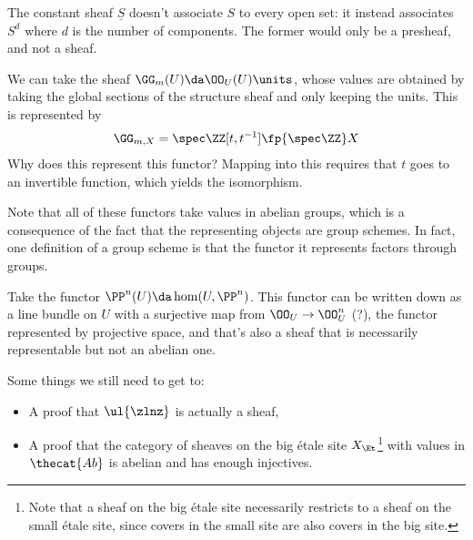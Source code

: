 \begin{warnings}

The constant sheaf \(\underline{S}\) doesn't associate \(S\) to every
open set: it instead associates \(S^d\) where \(d\) is the number of
components. The former would only be a presheaf, and not a sheaf.

\end{warnings}

\begin{example}[?]

We can take the sheaf \(\GG_m(U) \da \OO_U(U)\units\), whose values are
obtained by taking the global sections of the structure sheaf and only
keeping the units. This is represented by
\begin{align*}
\GG_{m, X} = \spec \ZZ[t, t^{-1}] \fp{\spec \ZZ} X
\end{align*} Why does this represent this functor? Mapping into this
requires that \(t\) goes to an invertible function, which yields the
isomorphism.

\end{example}

\begin{remark}

Note that all of these functors take values in abelian groups, which is
a consequence of the fact that the representing objects are group
schemes. In fact, one definition of a group scheme is that the functor
it represents factors through groups.

\end{remark}

\begin{example}[?]

Take the functor \(\PP^n(U) \da \hom(U, \PP^n)\). This functor can be
written down as a line bundle on \(U\) with a surjective map from
\(\OO_U \to \OO_U^n\) (?), the functor represented by projective space,
and that's also a sheaf that is necessarily representable but not an
abelian one.

\end{example}

Some things we still need to get to:

\begin{itemize}
\tightlist
\item
  A proof that \(\ul{\zlnz}\) is actually a sheaf,
\item
  A proof that the category of sheaves on the big étale site
  \(X_\Et\)\footnote{Note that a sheaf on the big étale site necessarily
    restricts to a sheaf on the small étale site, since covers in the
    small site are also covers in the big site.} with values in
  \(\thecat{Ab}\) is abelian and has enough injectives.
\end{itemize}

